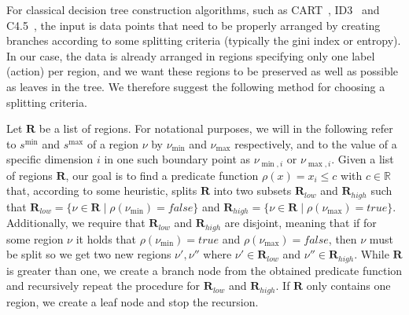 For classical decision tree construction algorithms, such as CART~\cite{?},
ID3~\cite{?} and C4.5~\cite{?}, the input is data points that need to be
properly arranged by creating branches according to some splitting criteria
(typically the gini index or entropy). In our case, the data is already arranged
in regions specifying only one label (action) per region, and we want these
regions to be preserved as well as possible as leaves in the tree. We therefore
suggest the following method for choosing a splitting criteria.

Let $\mathbf{R}$ be a list of regions. For notational purposes, we will in the
following refer to $s^{\min}$ and $s^{\max}$ of a region $\nu$ by $\nu_{\min}$
and $\nu_{\max}$ respectively, and to the value of a specific dimension $i$ in
one such boundary point as $\nu_{\min, i}$ or $\nu_{\max,i}$.  Given a list of
regions $\mathbf{R}$, our goal is to find a predicate function $\rho(x) = x_{i}
\leq c$ with $c \in \mathbb{R}$ that, according to some heuristic, splits
$\mathbf{R}$ into two subsets $\mathbf{R}_{low}$ and $\mathbf{R}_{high}$ such
that $\mathbf{R}_{low} = \{ \nu \in \mathbf{R} \mid \rho(\nu_{\min}) = false \}$
and $\mathbf{R}_{high} = \{ \nu \in \mathbf{R} \mid \rho(\nu_{\max}) = true \}$.
Additionally, we require that $\mathbf{R}_{low}$ and $\mathbf{R}_{high}$ are
disjoint, meaning that if for some region $\nu$ it holds that $\rho(\nu_{\min})
= true$ and $\rho(\nu_{\max}) = false$, then $\nu$ must be split so we get two
new regions $\nu', \nu''$ where $\nu' \in \mathbf{R}_{low}$ and $\nu'' \in
\mathbf{R}_{high}$. While $\mathbf{R}$ is greater than one, we create a branch
node from the obtained predicate function and recursively repeat the procedure
for $\mathbf{R}_{low}$ and $\mathbf{R}_{high}$. If $\mathbf{R}$ only contains
one region, we create a leaf node and stop the recursion.


